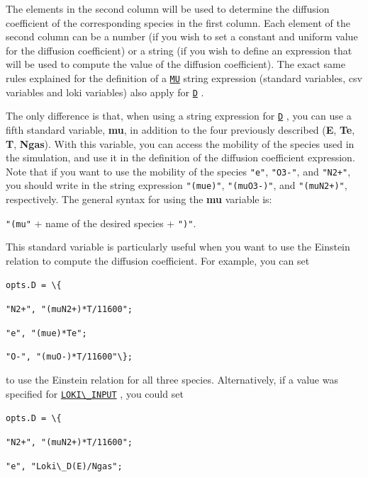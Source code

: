 \documentclass[12pt,a4paper]{article}
\newcommand{\matlabs}[1]{{\lstinline[style=MatlabStyle]!#1!}}
\newcommand{\seclink}[2]{%
	\begingroup
	\hypersetup{linkcolor=orange}%
	\hyperref[sec:#1]{\matlabs{#2}}%
	\endgroup
}
\begin{document}
	The elements in the second column will be used to determine the diffusion coefficient of the corresponding species in the first column. Each element of the second column can be a number (if you wish to set a constant and uniform value for the diffusion coefficient) or a string (if you wish to define an expression that will be used to compute the value of the diffusion coefficient). The exact same rules explained for the definition of a \seclink{mu}{MU} string expression (standard variables, csv variables and loki variables) also apply for \seclink{D}{D}. 
	
	The only difference is that, when using a string expression for \seclink{D}{D}, you can use a fifth standard variable, \textbf{mu}, in addition to the four previously described (\textbf{E}, \textbf{Te}, \textbf{T}, \textbf{Ngas}). With this variable, you can access the mobility of the species used in the simulation, and use it in the definition of the diffusion coefficient expression. Note that if you want to use the mobility of the species \matlabs{"e"}, \matlabs{"O3-"}, and \matlabs{"N2+"}, you should write in the string expression \matlabs{"(mue)"}, \matlabs{"(muO3-)"}, and \matlabs{"(muN2+)"}, respectively. 
	The general syntax for using the \textbf{mu} variable is: 
	
	\matlabs{"(mu"} + name of the desired species + \matlabs{")"}.
	
	\noindent This standard variable is particularly useful when you want to use the Einstein relation to compute the diffusion coefficient. For example, you can set
	
	\matlabs{opts.D = \{}
	
	\hspace{40pt} \matlabs{"N2+", "(muN2+)*T/11600";} 
	
	\hspace{40pt} \matlabs{"e", "(mue)*Te";}
	
	\hspace{40pt} \matlabs{"O-", "(muO-)*T/11600"\};}
	
	\noindent to use the Einstein relation for all three species. Alternatively, if a value was specified for \seclink{lokiinput}{LOKI\_INPUT}, you could set
	
	\matlabs{opts.D = \{}
	
	\hspace{40pt} \matlabs{"N2+", "(muN2+)*T/11600";} 
	
	\hspace{40pt} \matlabs{"e", "Loki\_D(E)/Ngas";}
	
\end{document}
